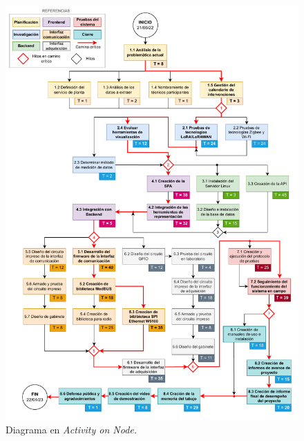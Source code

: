 \documentclass[
11pt%
]{charter}
\begin{document}



\begin{figure}[htpb]
\includegraphics[width=1\textwidth]{./Figuras/aonv8.drawio.pdf}
\caption{Diagrama en  \textit{Activity on Node.}}
\label{fig:diagBloques}
\end{figure}

\end{document}

